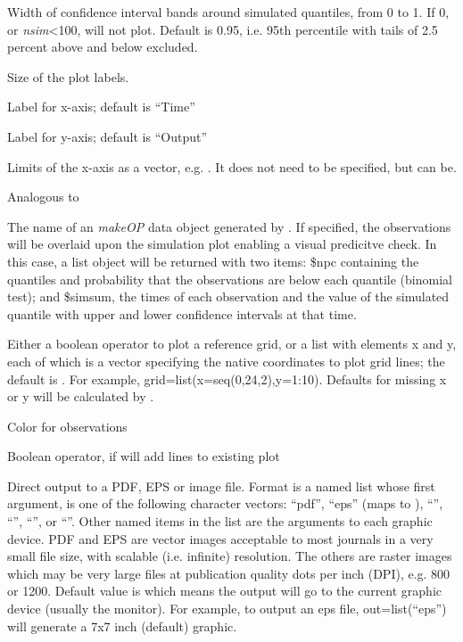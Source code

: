 \documentclass[a4paper]{book}
\begin{document}
\begin{Arguments}
\begin{ldescription}
\item[\code{ci}] Width of confidence interval bands around simulated quantiles, from 0 to 1.  If 0, or \emph{nsim}<100, will not plot.
Default is 0.95, i.e. 95th percentile with tails of 2.5 percent above and below excluded.

\item[\code{cex.lab}] Size of the plot labels.

\item[\code{xlab}] Label for x-axis; default is ``Time''

\item[\code{ylab}] Label for y-axis; default is ``Output''

\item[\code{xlim}] Limits of the x-axis as a vector, e.g. .  It does not need to be specified, but can be.

\item[\code{ylim}] Analogous to 

\item[\code{obs}] The name of an \emph{makeOP} data object generated by .  If specified,
the observations will be overlaid upon the simulation plot enabling a visual predicitve check.  In this case,
a list object will be returned with two items: \$npc containing the quantiles and probability that the observations
are below each quantile (binomial test); and \$simsum, the times of each observation and the 
value of the simulated quantile with upper and lower confidence intervals at that time.

\item[\code{grid}] Either a boolean operator to plot a reference grid, or a list with elements x and y,
each of which is a vector specifying the native coordinates to plot grid lines; the default is .
For example, grid=list(x=seq(0,24,2),y=1:10).  Defaults for missing x or y will be calculated by .

\item[\code{ocol}] Color for observations

\item[\code{add}] Boolean operator, if  will add lines to existing plot

\item[\code{out}] Direct output to a PDF, EPS or image file.  Format is a named list whose first argument, 
 is one of the following character vectors: ``pdf'', ``eps'' (maps to ),
``'', ``'', ``'', or ``''.  Other named items in the list
are the arguments to each graphic device. PDF and EPS are vector images acceptable to most journals
in a very small file size, with scalable (i.e. infinite) resolution.  The others are raster images which may be very
large files at publication quality dots per inch (DPI), e.g. 800 or 1200. Default value is  which means the 
output will go to the current graphic device (usually the monitor). For example, to output an eps file,
out=list(``eps'') will generate a 7x7 inch (default) graphic.


\end{ldescription}
\end{Arguments}
\end{document}

